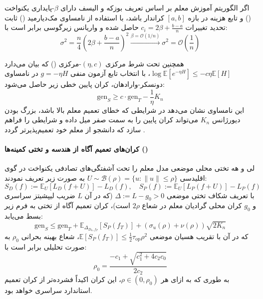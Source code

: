 اگر الگوریتم آموزش معلم بر اساس تعریف بوزکه و الیسف \cite{li2026generalization} دارای $\beta$-پایداری یکنواخت () و تابع هزینه در بازه $[a, b]$ کراندار باشد، با استفاده از نامساوی مک‌دیارمید () ثابت تحدید تغییرات $c_i = 2\beta + \frac{b-a}{n}$ حاصل شده و واریانس زیرگوسی برابر است با:
\begin{equation}
    \sigma^2 = \frac{n}{4} \left( 2\beta + \frac{b-a}{n} \right)^2 \xrightarrow{\beta = \mathcal{O}(1/n)} \sigma^2 = \mathcal{O}\left(\frac{1}{n}\right)
\end{equation}

همچنین تحت شرط مرکزی $(\eta, c)$-مرکزی () که بیان می‌دارد $\log \mathbb{E}[e^{-\eta H}] \le -c \eta \mathbb{E}[H]$، با انتخاب تابع آزمون منفی $g = -\eta H$ در نامساوی دونسکر-وارادهان، کران پایین خطی زیر حاصل می‌شود:
\begin{equation}
    \text{gen}_S \ge c \cdot \text{gen}_T - \frac{1}{\eta} K_n
\end{equation}
این نامساوی نشان می‌دهد در شرایطی که خطای تعمیم معلم بالا باشد، بزرگ بودن دیورژانس $K_n$ می‌تواند کران پایین را به سمت صفر میل داده و شرایطی را فراهم سازد که دانشجو از معلم خود تعمیم‌پذیرتر گردد \cite{li2026generalization}.

\paragraph*{کران‌های تعمیم آگاه از هندسه و تختی کمینه‌ها ()}
لی و هه \cite{li2026generalization} تختی محلی موضعی مدل معلم را تحت آشفتگی‌های تصادفی یکنواخت در گوی اقلیدسی $U \sim \mathcal{B}(\rho) = \{u : \|u\| \le \rho\}$ به صورت زیر تعریف نمودند:
\begin{equation}
    S_D(f) := \mathbb{E}_U [L_D(f + U)] - L_D(f), \quad S_P(f) := \mathbb{E}_U [L_P(f + U)] - L_P(f)
\end{equation}
با تعریف شکاف تختی موضعی $\Delta := L - g_0 > 0$ (که در آن $L$ ضریب لیپشیتز سراسری و $g_0$ کران محلی گرادیان معلم در شعاع $2\rho$ است)، کران تعمیم آگاه از تختی به فرم زیر بسط می‌یابد:
\begin{equation}
    \text{gen}_S \le \text{gen}_T + \mathbb{E}_{\Delta_{D_n, f_T}}[S_P(f_T)] + (\sigma_u(\rho) + \nu(\rho))\sqrt{2 K_n}
\end{equation}
که در آن با تقریب هسیان موضعی $\mathbb{E}[S_P(f_T)] \le \frac{1}{2}\tau_{\text{op}}\rho^2$، شعاع بهینه بحرانی $\rho_0$ به صورت تحلیلی برابر است با:
\begin{equation}
    \rho_0 = \frac{-c_1 + \sqrt{c_1^2 + 4 c_2 c_0}}{2 c_2}
\end{equation}
به طوری که به ازای هر $\rho \in (0, \rho_0)$، این کران اکیداً فشرده‌تر از کران تعمیم استاندارد سراسری خواهد بود.

